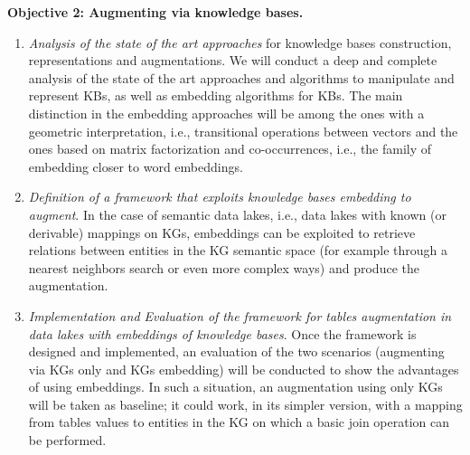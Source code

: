 \noindent\textbf{Objective 2: Augmenting via knowledge bases.}
\begin{enumerate}
    \item \textit{Analysis of the state of the art approaches} for knowledge bases construction, representations and augmentations. We will conduct a deep and complete analysis of the state of the art approaches and algorithms to manipulate and represent KBs, as well as embedding algorithms for KBs. The main distinction in the embedding approaches will be among the ones with a geometric interpretation, i.e., transitional operations between vectors and the ones based on matrix factorization and co-occurrences, i.e., the family of embedding closer to word embeddings.
    \item \textit{Definition of a framework that exploits knowledge bases embedding to augment}. In the case of semantic data lakes, i.e., data lakes with known (or derivable) mappings on KGs, embeddings can be exploited to retrieve relations between entities in the KG semantic space (for example through a nearest neighbors search or even more complex ways) and produce the augmentation. 
    \item \textit{Implementation and Evaluation of the framework for tables augmentation in data lakes with embeddings of knowledge bases}. Once the framework is designed and implemented, an evaluation of the two scenarios (augmenting via KGs only and KGs embedding) will be conducted to show the advantages of using embeddings. In such a situation, an augmentation using only KGs will be taken as baseline; it could work, in its simpler version, with a mapping from tables values to entities in the KG on which a basic join operation can be performed.
\end{enumerate}


